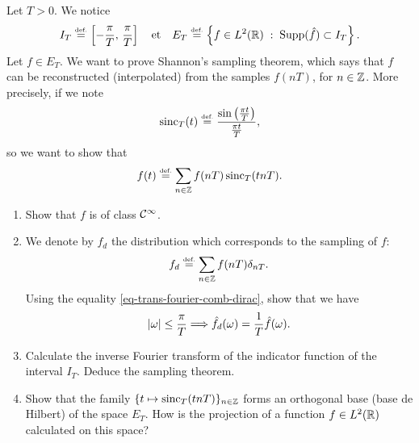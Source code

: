  
\begin{exo}
\label{exo-sample-shannon}
 
   Let $ T> 0 $. We notice
\begin{equation*}
I_T \stackrel{\mbox{\upshape\tiny def.}}{=} \left[- \frac{\pi}{T}, \, \frac{\pi}{T} \right] \quad \text{et} \quad E_T \stackrel{\mbox{\upshape\tiny def.}}{=} \left\{ f \in L^2 (\mathbb{R}) \;:\; \operatorname{Supp} (\hat{f}) \subset I_T \right\}.
\end{equation*}
Let $ f \in E_T $. We want to prove Shannon's sampling theorem, which says that $ f $ can be reconstructed (interpolated) from the samples $ f(n T) $, for $ n \in \mathbb{Z} $. More precisely, if we note
\begin{equation}
\label{eqn-formula-reconstruction-shannon}
\operatorname{sinc}_T (t) \stackrel{\mbox{\upshape\tiny def.}}{=} \frac{\sin \left(\frac{\pi t}{T} \right)}{\frac{\pi t}{T}},
\end{equation}
so we want to show that
\begin{equation*}
f(t) \stackrel{\mbox{\upshape\tiny def.}}{=} \sum_{n \in \mathbb{Z}}{f(n T) \operatorname{sinc}_T (tn T)}.
\end{equation*}
\begin{enumerate}
\item Show that $ f $ is of class $ \mathcal{C}^\infty $.
\item We denote by $ f_d $ the distribution which corresponds to the sampling of $ f $:
\begin{equation*}
f_d \stackrel{\mbox{\upshape\tiny def.}}{=} \sum_{n \in \mathbb{Z}}{f(n T) \delta_{n T}}.
\end{equation*}
Using the equality \eqref{eq-trans-fourier-comb-dirac}, show that we have
\begin{equation*}
| \omega | \leq \frac{\pi}{T} \Longrightarrow \hat{f_d} (\omega) = \frac{1}{T} \hat{f} (\omega).
\end{equation*}
 
\item Calculate the inverse Fourier transform of the indicator function of the interval $ I_T $. Deduce the sampling theorem.
\item {}  Show that the family $ \{t \mapsto \operatorname{sinc}_T (t n T)\}_{n \in \mathbb{Z}} $ forms an orthogonal base (base de Hilbert) of the space $ E_T $. How is the projection of a function $ f \in L^2 (\mathbb{R}) $ calculated on this space?
\end{enumerate}
\end{exo}
